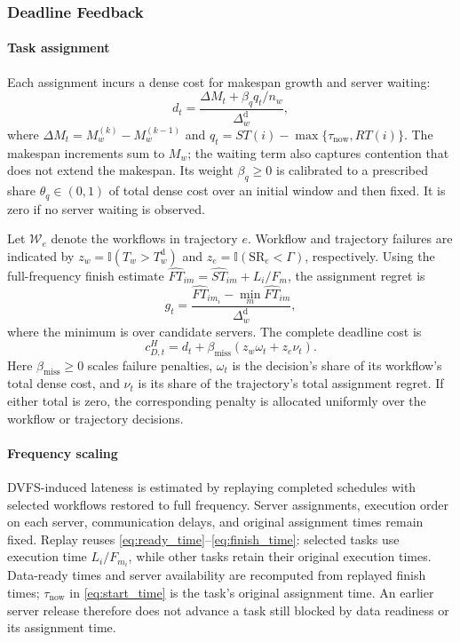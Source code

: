 \documentclass[journal]{IEEEtran}
\newcommand{\ind}{\mathbb{I}}
\begin{document}
\subsubsection{Deadline Feedback}

\paragraph{Task assignment}
Each assignment incurs a dense cost for makespan growth and server waiting:
\begin{equation}
    d_t=\frac{\Delta M_t+\beta_q q_t/n_w}
                  {\Delta_w^{\mathrm d}},
    \label{eq:method_dense_cost}
\end{equation}
where $\Delta M_t=M_w^{(k)}-M_w^{(k-1)}$ and $q_t=ST(i)-\max\{\tau_{\mathrm{now}},RT(i)\}$. The makespan increments sum to $M_w$; the waiting term also captures contention that does not extend the makespan. Its weight $\beta_q\geq0$ is calibrated to a prescribed share $\theta_q\in(0,1)$ of total dense cost over an initial window and then fixed. It is zero if no server waiting is observed.

Let $\mathcal W_e$ denote the workflows in trajectory $e$. Workflow and trajectory failures are indicated by $z_w=\ind(T_w>T_w^{\mathrm d})$ and $z_e=\ind(\mathrm{SR}_e<\Gamma)$, respectively. Using the full-frequency finish estimate $\widehat{FT}_{im}=\widehat{ST}_{im}+L_i/F_m$, the assignment regret is
\[
    g_t=\frac{\widehat{FT}_{i m_i}
        -\min_m\widehat{FT}_{im}}{\Delta_w^{\mathrm d}},
\]
where the minimum is over candidate servers. The complete deadline cost is
\begin{equation}
    c_{D,t}^H=d_t+\beta_{\mathrm{miss}}
        (z_w\omega_t+z_e\nu_t).
    \label{eq:method_high_deadline}
\end{equation}
Here $\beta_{\mathrm{miss}}\geq0$ scales failure penalties, $\omega_t$ is the decision's share of its workflow's total dense cost, and $\nu_t$ is its share of the trajectory's total assignment regret. If either total is zero, the corresponding penalty is allocated uniformly over the workflow or trajectory decisions.

\paragraph{Frequency scaling}
DVFS-induced lateness is estimated by replaying completed schedules with selected workflows restored to full frequency. Server assignments, execution order on each server, communication delays, and original assignment times remain fixed. Replay reuses \eqref{eq:ready_time}--\eqref{eq:finish_time}: selected tasks use execution time $L_i/F_{m_i}$, while other tasks retain their original execution times. Data-ready times and server availability are recomputed from replayed finish times; $\tau_{\mathrm{now}}$ in \eqref{eq:start_time} is the task's original assignment time. An earlier server release therefore does not advance a task still blocked by data readiness or its assignment time.
\end{document}
